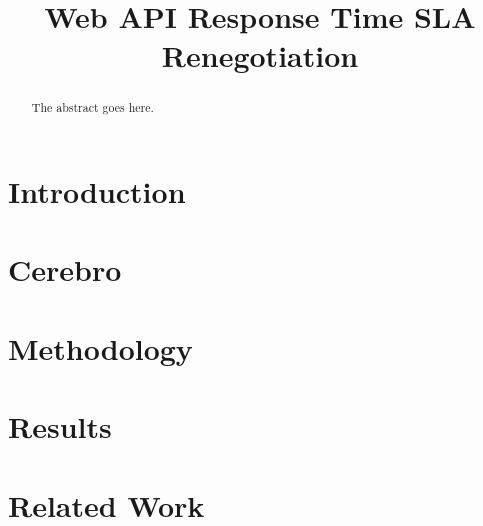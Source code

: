 \documentclass[conference,compsoc]{IEEEtran}
\begin{document}
%
\title{Web API Response Time SLA Renegotiation}

\author{
}

\maketitle


\begin{abstract}
The abstract goes here.
\end{abstract}

\vspace{-0.1in}
\section{Introduction}
\vspace{-0.1in}
\label{sec:intro}


\vspace{-0.1in}
\section{Cerebro}
\vspace{-0.1in}
\label{sec:cerebro}


\vspace{-0.1in}
\section{Methodology}
\vspace{-0.1in}
\label{sec:methodology}


\vspace{-0.1in}
\section{Results}
\vspace{-0.1in}
\label{sec:results}


\vspace{-0.1in}
\section{Related Work}
\vspace{-0.1in}
\label{sec:related_work}

\end{document}
